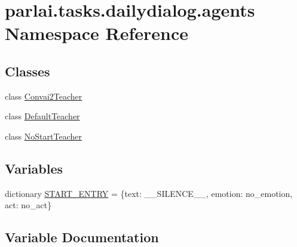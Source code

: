 \hypertarget{namespaceparlai_1_1tasks_1_1dailydialog_1_1agents}{}\section{parlai.\+tasks.\+dailydialog.\+agents Namespace Reference}
\label{namespaceparlai_1_1tasks_1_1dailydialog_1_1agents}
\subsection*{Classes}
\begin{DoxyCompactItemize}
\item 
class \hyperlink{classparlai_1_1tasks_1_1dailydialog_1_1agents_1_1Convai2Teacher}{Convai2\+Teacher}
\item 
class \hyperlink{classparlai_1_1tasks_1_1dailydialog_1_1agents_1_1DefaultTeacher}{Default\+Teacher}
\item 
class \hyperlink{classparlai_1_1tasks_1_1dailydialog_1_1agents_1_1NoStartTeacher}{No\+Start\+Teacher}
\end{DoxyCompactItemize}
\subsection*{Variables}
\begin{DoxyCompactItemize}
\item 
dictionary \hyperlink{namespaceparlai_1_1tasks_1_1dailydialog_1_1agents_a327aad350a96c1176acc6590e093e270}{S\+T\+A\+R\+T\+\_\+\+E\+N\+T\+RY} = \{\textquotesingle{}text\textquotesingle{}\+: \textquotesingle{}\+\_\+\+\_\+\+S\+I\+L\+E\+N\+C\+E\+\_\+\+\_\+\textquotesingle{}, \textquotesingle{}emotion\textquotesingle{}\+: \textquotesingle{}no\+\_\+emotion\textquotesingle{}, \textquotesingle{}act\textquotesingle{}\+: \textquotesingle{}no\+\_\+act\textquotesingle{}\}
\end{DoxyCompactItemize}


\subsection{Variable Documentation}
\mbox{\label{namespaceparlai_1_1tasks_1_1dailydialog_1_1agents_a327aad350a96c1176acc6590e093e270}} 
